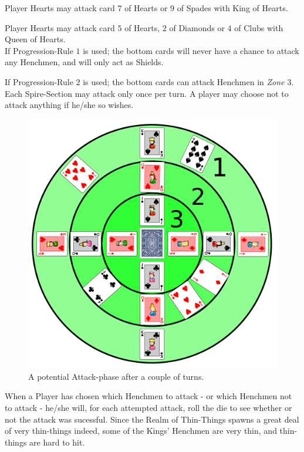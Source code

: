 \documentclass[11pt,twocolumn]{article}
\begin{document}
Player Hearts may attack card $7$ of Hearts or $9$ of Spades with King of Hearts.

Player Hearts may attack card $5$ of Hearts, $2$ of Diamonds or $4$ of Clubs with Queen of Hearts.\\

\noindent
If Progression-Rule $1$ is used; the bottom cards will never have a chance to attack any Henchmen, and will only act as Shields.

If Progression-Rule $2$ is used; the bottom cards can attack Henchmen in \textit{Zone $3$}. \\

\noindent
Each Spire-Section may attack only once per turn. A player may choose not to attack anything if he/she so wishes.

\begin{figure}[h!]
\centering
\includegraphics[width=\linewidth]{img/attack.png}
\caption{A potential Attack-phase after a couple of turns.}
\label{fig:attack}
\end{figure}

\noindent
When a Player has chosen which Henchmen to attack - or which Henchmen not to attack - he/she will, for each attempted attack, roll the die to see whether or not the attack was sucessful.
Since the Realm of Thin-Things spawns a great deal of very thin-things indeed, some of the Kings' Henchmen are very thin, and thin-things are hard to hit.
\end{document}
